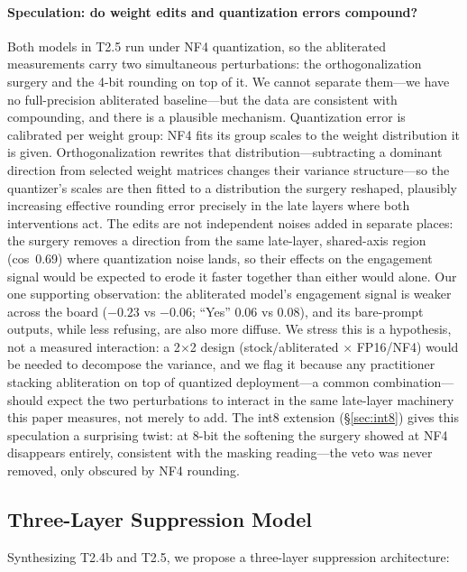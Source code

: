 \documentclass[11pt,a4paper]{article}
\begin{document}
\paragraph{Speculation: do weight edits and quantization errors compound?} Both models in T2.5 run under NF4 quantization, so the abliterated measurements carry two simultaneous perturbations: the orthogonalization surgery and the 4-bit rounding on top of it. We cannot separate them---we have no full-precision abliterated baseline---but the data are consistent with compounding, and there is a plausible mechanism. Quantization error is calibrated per weight group: NF4 fits its group scales to the weight distribution it is given. Orthogonalization rewrites that distribution---subtracting a dominant direction from selected weight matrices changes their variance structure---so the quantizer's scales are then fitted to a distribution the surgery reshaped, plausibly increasing effective rounding error precisely in the late layers where both interventions act. The edits are not independent noises added in separate places: the surgery removes a direction from the same late-layer, shared-axis region (cos~0.69) where quantization noise lands, so their effects on the engagement signal would be expected to erode it faster together than either would alone. Our one supporting observation: the abliterated model's engagement signal is weaker across the board ($-0.23$ vs $-0.06$; ``Yes'' $0.06$ vs $0.08$), and its bare-prompt outputs, while less refusing, are also more diffuse. We stress this is a hypothesis, not a measured interaction: a 2$\times$2 design (stock/abliterated $\times$ FP16/NF4) would be needed to decompose the variance, and we flag it because any practitioner stacking abliteration on top of quantized deployment---a common combination---should expect the two perturbations to interact in the same late-layer machinery this paper measures, not merely to add. The int8 extension (\S\ref{sec:int8}) gives this speculation a surprising twist: at 8-bit the softening the surgery showed at NF4 disappears entirely, consistent with the masking reading---the veto was never removed, only obscured by NF4 rounding.

\subsection{Three-Layer Suppression Model}

Synthesizing T2.4b and T2.5, we propose a three-layer suppression architecture:
\end{document}
